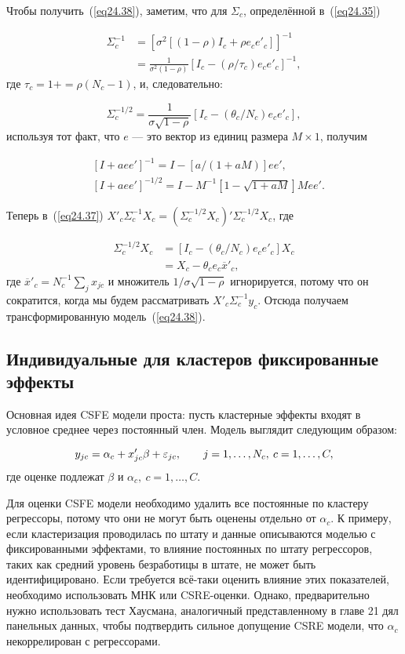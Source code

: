 Чтобы получить~(\ref{eq24.38}), заметим, что для $\Sigma_c$, определённой в~(\ref{eq24.35}) 

\begin{align}
\Sigma_c^{-1} & = \left[ \sigma^2 [(1-\rho)I_c + \rho e_c e'_c] \right]^{-1} \nonumber\\
& =  \frac{1}{\sigma^2 (1-\rho)} [I_c - (\rho / \tau_c) e_c e'_c]^{-1}, \nonumber
\end{align}
где $\tau_c = 1 + =\rho (N_c - 1)$, и, следовательно:

$$
\Sigma_c^{-1/2}=  \frac{1}{\sigma \sqrt{1-\rho}} [I_c - (\theta_c / N_c) e_c e'_c], 
$$
используя тот факт, что $e$ --- это вектор из единиц размера $M \times 1$, получим

\begin{align}
& [I+aee']^{-1} = I - [a/(1+aM)] ee', \nonumber\\
& [I+aee']^{-1/2} = I - M^{-1}[ 1 - \sqrt{1+aM}]M ee'. \nonumber
\end{align}

Теперь в~(\ref{eq24.37}) $X'_c \Sigma_c^{-1} X_c = \left( \Sigma_c^{-1/2} X_c \right)' \Sigma_c^{-1/2} X_c$, где

\begin{align}
\Sigma_c^{-1/2} X_c & = [I_c - (\theta_c / N_c) e_c e'_c]X_c \nonumber\\
& = X_c - \theta_c e_c \overline{x}'_c, \nonumber
\end{align}
где $\overline{x}'_c = N_c^{-1} \sum_j x_{jc}$ и множитель $1 / \sigma \sqrt{ 1 - \rho}$ игнорируется, потому что он сократится, когда мы будем рассматривать $X'_c \Sigma_c^{-1} y_c$. Отсюда получаем трансформированную модель~(\ref{eq24.38}). 

\subsection{Индивидуальные для кластеров фиксированные эффекты}

Основная идея CSFE модели проста: пусть кластерные эффекты входят в условное среднее через постоянный член. Модель выглядит следующим образом:

\begin{equation}
\label{eq24.40}
y_{jc} = \alpha_c + x'_{jc} \beta + \varepsilon_{jc}, \qquad j = 1, \dots , N_c, \: c = 1, \dots , C,
\end{equation}
где оценке подлежат $\beta$ и $\alpha_c, \: c = 1, \dots, C$. 

Для оценки CSFE модели необходимо удалить все постоянные по кластеру регрессоры, потому что они не могут быть оценены отдельно от $\alpha_c$. К примеру, если кластеризация проводилась по штату и данные описываются моделью с фиксированными эффектами, то влияние постоянных по штату регрессоров, таких как средний уровень безработицы в штате, не может быть идентифицировано. Если требуется всё-таки оценить влияние этих показателей, необходимо использовать МНК или CSRE-оценки. Однако, предварительно нужно использовать тест Хаусмана, аналогичный представленному в главе 21 дял панельных данных, чтобы подтвердить сильное допущение CSRE модели, что $\alpha_c$ некоррелирован с регрессорами. 

